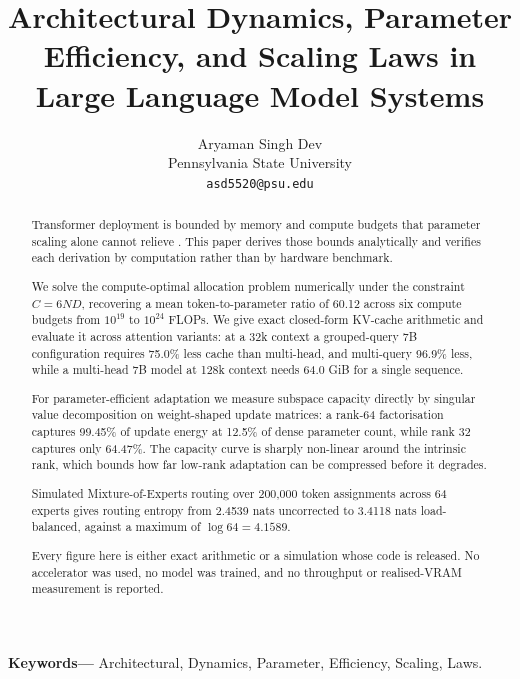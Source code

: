 \documentclass[10pt,journal,compsoc,twocolumn]{IEEEtran}
\begin{document}
\title{Architectural Dynamics, Parameter Efficiency, and Scaling Laws in Large Language Model Systems}

\author{
Aryaman Singh Dev\\
Pennsylvania State University \\
\texttt{asd5520@psu.edu}
}

\maketitle

\begin{abstract}
Transformer deployment is bounded by memory and compute budgets that parameter scaling alone cannot relieve \cite{arxiv_2005_14165,arxiv_2406_00584}. This paper derives those bounds analytically and verifies each derivation by computation rather than by hardware benchmark.

We solve the compute-optimal allocation problem numerically under the constraint $C = 6ND$, recovering a mean token-to-parameter ratio of 60.12 across six compute budgets from $10^{19}$ to $10^{24}$ FLOPs. We give exact closed-form KV-cache arithmetic and evaluate it across attention variants: at a 32k context a grouped-query 7B configuration requires 75.0\% less cache than multi-head, and multi-query 96.9\% less, while a multi-head 7B model at 128k context needs 64.0 GiB for a single sequence.

For parameter-efficient adaptation we measure subspace capacity directly by singular value decomposition on weight-shaped update matrices: a rank-64 factorisation captures 99.45\% of update energy at 12.5\% of dense parameter count, while rank 32 captures only 64.47\%. The capacity curve is sharply non-linear around the intrinsic rank, which bounds how far low-rank adaptation can be compressed before it degrades.

Simulated Mixture-of-Experts routing over 200{,}000 token assignments across 64 experts gives routing entropy from 2.4539 nats uncorrected to 3.4118 nats load-balanced, against a maximum of $\log 64 = 4.1589$.

Every figure here is either exact arithmetic or a simulation whose code is released. No accelerator was used, no model was trained, and no throughput or realised-VRAM measurement is reported.
\end{abstract}

\noindent\textbf{Keywords---} Architectural, Dynamics, Parameter, Efficiency, Scaling, Laws.
\end{document}
